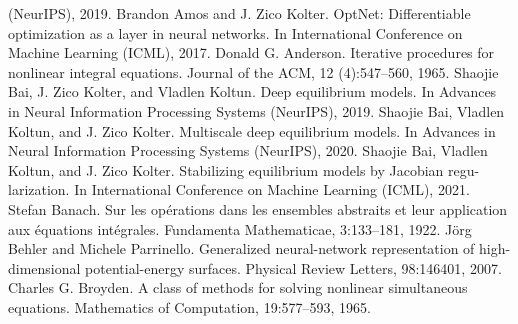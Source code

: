 \documentclass{article}
\begin{document}
(NeurIPS), 2019.
Brandon Amos and J. Zico Kolter. OptNet: Differentiable optimization as a layer in neural networks.
In International Conference on Machine Learning (ICML), 2017.
Donald G. Anderson. Iterative procedures for nonlinear integral equations. Journal of the ACM, 12
(4):547--560, 1965.
Shaojie Bai, J. Zico Kolter, and Vladlen Koltun. Deep equilibrium models. In Advances in Neural
Information Processing Systems (NeurIPS), 2019.
Shaojie Bai, Vladlen Koltun, and J. Zico Kolter. Multiscale deep equilibrium models. In Advances
in Neural Information Processing Systems (NeurIPS), 2020.
Shaojie Bai, Vladlen Koltun, and J. Zico Kolter. Stabilizing equilibrium models by Jacobian regu-
larization. In International Conference on Machine Learning (ICML), 2021.
Stefan Banach. Sur les op\'erations dans les ensembles abstraits et leur application aux \'equations
int\'egrales. Fundamenta Mathematicae, 3:133--181, 1922.
J\"org Behler and Michele Parrinello. Generalized neural-network representation of high-dimensional
potential-energy surfaces. Physical Review Letters, 98:146401, 2007.
Charles G. Broyden. A class of methods for solving nonlinear simultaneous equations. Mathematics
of Computation, 19:577--593, 1965.
\clearpage

\end{document}
